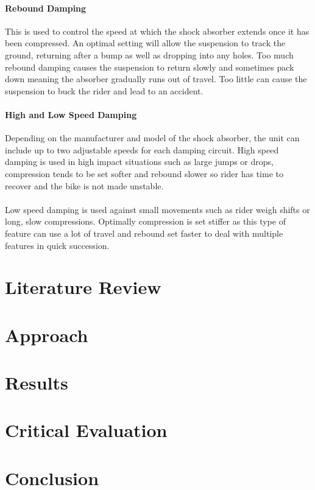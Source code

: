 \documentclass[a4paper, 12pt, hidelinks]{article}
\begin{document}
	\paragraph{Rebound Damping}
		This is used to control the speed at which the shock absorber extends once it has been compressed. An optimal setting will allow the suspension to track the ground, returning after a bump as well as dropping into any holes. Too much rebound damping causes the suspension to return slowly and sometimes pack down meaning the absorber gradually runs out of travel. Too little can cause the suspension to buck the rider and lead to an accident.
	\paragraph{High and Low Speed Damping} 
		Depending on the manufacturer and model of the shock absorber, the unit can include up to two adjustable speeds for each damping circuit. High speed damping is used in high impact situations such as large jumps or drops, compression tends to be set softer and rebound slower so rider has time to recover and the bike is not made unstable.
		\\\\
		Low speed damping is used against small movements such as rider weigh shifts or long, slow compressions. Optimally compression is set stiffer as this type of feature can use a lot of travel and rebound set faster to deal with multiple features in quick succession.
	\newpage
	\section{Literature Review}
	\newpage
	\section{Approach}
	\newpage	
	\section{Results}
	\newpage
	\section{Critical Evaluation}
	\newpage
	\section{Conclusion}
	\newpage
		
	\newpage
	\printacronyms
	\printglossary[type=main]
	
\end{document}
